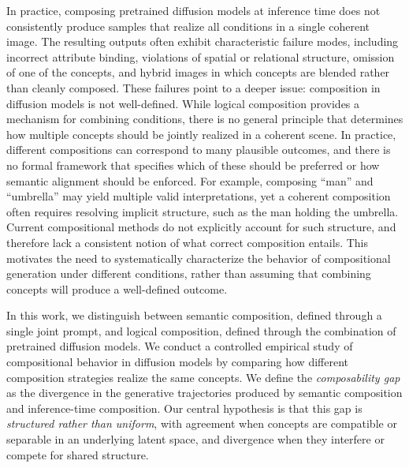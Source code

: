 \documentclass{article}
\begin{document}
In practice, composing pretrained diffusion models at inference time does not consistently produce samples that realize all conditions in a single coherent image. 
The resulting outputs often exhibit characteristic failure modes, including incorrect attribute binding, violations of spatial or relational structure, omission of one of the concepts, and hybrid images in which concepts are blended rather than cleanly composed.
These failures point to a deeper issue: composition in diffusion models is not well-defined. 
While logical composition provides a mechanism for combining conditions, there is no general principle that determines how multiple concepts should be jointly realized in a coherent scene. 
In practice, different compositions can correspond to many plausible outcomes, and there is no formal framework that specifies which of these should be preferred or how semantic alignment should be enforced. 
For example, composing ``man'' and ``umbrella'' may yield multiple valid interpretations, yet a coherent composition often requires resolving implicit structure, such as the man holding the umbrella. 
Current compositional methods do not explicitly account for such structure, and therefore lack a consistent notion of what correct composition entails. 
This motivates the need to systematically characterize the behavior of compositional generation under different conditions, rather than assuming that combining concepts will produce a well-defined outcome.

In this work, we distinguish between semantic composition, defined through a single joint prompt, and logical composition, defined through the combination of pretrained diffusion models. 
We conduct a controlled empirical study of compositional behavior in diffusion models by comparing how different composition strategies realize the same concepts.
We define the \emph{composability gap} as the divergence in the generative trajectories produced by semantic composition and inference-time composition.
Our central hypothesis is that this gap is \emph{structured rather than uniform}, with agreement when concepts are compatible or separable in an underlying latent space, and divergence when they interfere or compete for shared structure.
\end{document}
